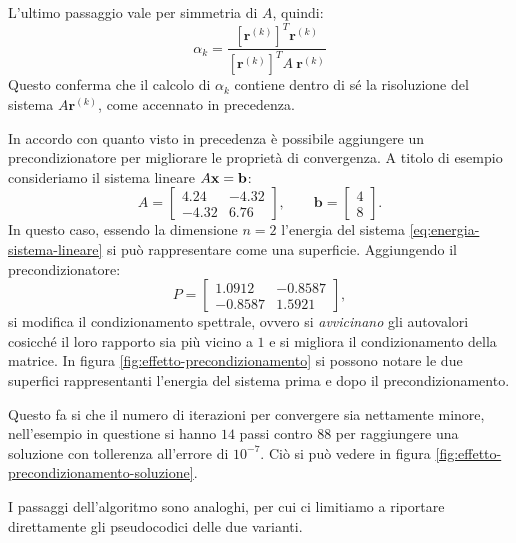 L'ultimo passaggio vale per simmetria di $A$, quindi:
\begin{equation}
\alpha _{k} =\frac{\left[\mathbf{r}^{( k)}\right]^{T}\mathbf{r}^{( k)}}{\left[\mathbf{r}^{( k)}\right]^{T} A\ \mathbf{r}^{( k)}}
\label{eq:alpha-ottimale-metodo-gradiente}
\end{equation}
Questo conferma che il calcolo di $\alpha _{k}$ contiene dentro di sé la risoluzione del sistema $A\mathbf{r}^{(k)}$, come accennato in precedenza.

In accordo con quanto visto in precedenza è possibile aggiungere un precondizionatore per migliorare le proprietà di convergenza. A titolo di esempio consideriamo il sistema lineare $A\mathbf{x}=\mathbf{b}$:
\begin{equation*}
	A=\begin{bmatrix}
		4.24 & -4.32 \\
		-4.32 & 6.76
	\end{bmatrix},
	\qquad \mathbf{b}=
	\begin{bmatrix}
		4\\
		8
	\end{bmatrix}.
	\label{eq:esempio-energia-sistema}
\end{equation*}
In questo caso, essendo la dimensione $n=2$ l'energia del sistema \eqref{eq:energia-sistema-lineare} si può rappresentare come una superficie.
Aggiungendo il precondizionatore:
\begin{equation*}
	P=\begin{bmatrix}
		 1.0912 & -0.8587\\
    	-0.8587 &  1.5921
	\end{bmatrix},
\end{equation*}
si modifica il condizionamento spettrale, ovvero si \textit{avvicinano} gli autovalori cosicché il loro rapporto sia più vicino a $1$ e si migliora il condizionamento della matrice. In figura \ref{fig:effetto-precondizionamento} si possono notare le due superfici rappresentanti l'energia del sistema prima e dopo il precondizionamento.

Questo fa si che il numero di iterazioni per convergere sia nettamente minore, nell'esempio in questione si hanno $14$ passi contro $88$ per raggiungere una soluzione con tollerenza all'errore di $10^{-7}$. Ciò si può vedere in figura \ref{fig:effetto-precondizionamento-soluzione}.

I passaggi dell'algoritmo sono analoghi, per cui ci limitiamo a riportare direttamente gli pseudocodici delle due varianti.

